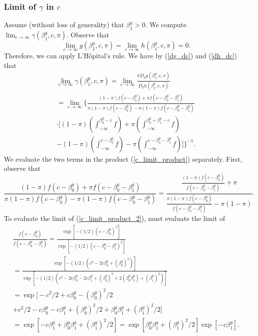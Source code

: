 \documentclass[12pt]{article}
\begin{document}
\subsubsection{Limit of $\gamma$ in $c$}

Assume (without loss of generality) that $\beta^g_1 > 0$. We compute $\lim_{c \to \infty} \gamma(\beta^g_1, c, \pi)$. Observe that $$\lim_{c \to \infty} g(\beta^g_1, c, \pi) = \lim_{c \to \infty} h(\beta^g_1, c, \pi)  = 0.$$ Therefore, we can apply L'H\^{o}pital's rule. We have by (\ref{dg_dc}) and (\ref{dh_dc}) that \begin{multline}\label{c_limit_product}
\lim_{c \to \infty} \gamma(\beta^g_1, c, \pi) = \lim_{c \to \infty} \frac{\pi D_2 g(\beta^g_1, c, \pi)}{D_2h(\beta^g_1, c, \pi)} \\ = \lim_{c \to \infty} \bigg\{ \frac{(1-\pi) f(c - \beta^g_0) + \pi f(c - \beta^g_0 - \beta^g_1)}{\pi (1-\pi) f(c - \beta^g_0) - \pi (1-\pi)f(c - \beta^g_0 - \beta^g_1)} \\ \cdot \bigg[ (1-\pi)\left( \int_{-\infty}^{\beta_0^g - c} f \right) + \pi \left(\int_{-\infty}^{ \beta^g_0 + \beta^g_1 - c} f \right) \\ - (1-\pi)\left(\int_{-\infty}^{c - \beta^g_0} f \right) - \pi \left(\int_{-\infty}^{c - \beta_0^g - \beta_1^g} f \right) \bigg] \bigg\}^{-1}.
 \end{multline}
 We evaluate the two terms in the product (\ref{c_limit_product}) separately. First, observe that
 \begin{equation}\label{c_limit_product_2}
 \frac{(1-\pi) f(c - \beta^g_0) + \pi f(c - \beta^g_0 - \beta^g_1)}{\pi (1-\pi) f(c - \beta^g_0) - \pi (1-\pi)f(c - \beta^g_0 - \beta^g_1)} = \frac{\frac{(1-\pi) f(c - \beta^g_0)}{ f(c - \beta^g_0 - \beta^g_1)} + \pi}{\frac{ \pi(1-\pi) f(c - \beta^g_0)}{ f(c - \beta^g_0 - \beta^g_1)} - \pi(1-\pi)}.
 \end{equation}
 To evaluate the limit of (\ref{c_limit_product_2}), must evaluate the limit of
 \begin{multline}\label{c_limit_product_3}
 \frac{f(c - \beta^g_0)}{f(c - \beta^g_0 - \beta^g_1)} = \frac{\exp{[-(1/2)(c - \beta_0^g)^2]}}{\exp{[-(1/2)( c - \beta^g_0 - \beta^g_1)^2]}} \\ = \frac{\exp[ -(1/2)(c^2 - 2 c \beta^g_0 + (\beta^g_0)^2)]}{\exp\left[-(1/2)( c^2 - 2c \beta^g_0 - 2 c \beta^g_1 + (\beta^g_0)^2 + 2( \beta^g_0 \beta^g_1) + (\beta^g_1)^2)\right]} \\ = \exp\big[-c^2/2 + c \beta^g_0 - (\beta^g_0)^2/2 \\ + c^2/2 - c \beta^g_0 - c \beta^g_1 + (\beta^g_0)^2/2 + \beta^g_0 \beta^g_1 + (\beta^g_1)^2/2 \big] \\ = \exp[ -c \beta^g_1 + \beta^g_0 \beta^g_1 + (\beta^g_1)^2/2] = \exp[ \beta^g_0 \beta^g_1 + (\beta^g_1)^2/2]\exp[ -c \beta^g_1]. 
\end{multline}
\end{document}
